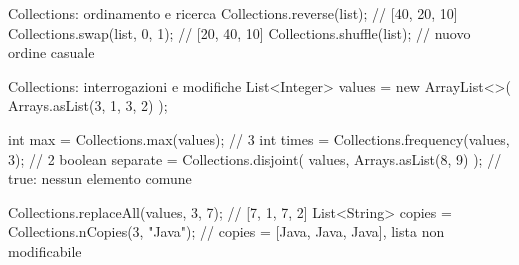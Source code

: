 ﻿\documentclass[10pt,a4paper]{article}
\newenvironment{topicblock}{%
  \par\medskip\noindent\begin{minipage}{\textwidth}%
}{%
  \end{minipage}\par\medskip%
}
\begin{document}
\begin{topicblock}
\begin{codebox}{Collections: ordinamento e ricerca}
Collections.reverse(list);    // [40, 20, 10]
Collections.swap(list, 0, 1); // [20, 40, 10]
Collections.shuffle(list);    // nuovo ordine casuale
\end{codebox}

\begin{codebox}{Collections: interrogazioni e modifiche}
List<Integer> values = new ArrayList<>(
    Arrays.asList(3, 1, 3, 2)
);

int max = Collections.max(values);       // 3
int times = Collections.frequency(values, 3); // 2
boolean separate = Collections.disjoint(
    values, Arrays.asList(8, 9)
); // true: nessun elemento comune

Collections.replaceAll(values, 3, 7); // [7, 1, 7, 2]
List<String> copies = Collections.nCopies(3, "Java");
// copies = [Java, Java, Java], lista non modificabile
\end{codebox}

\end{topicblock}
\end{document}

